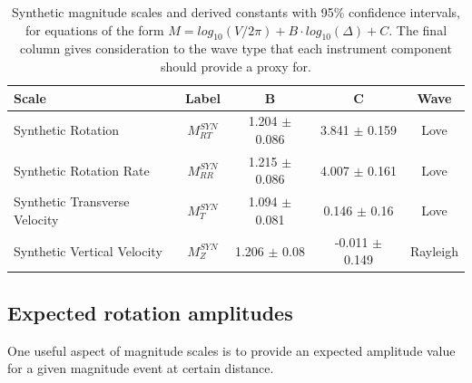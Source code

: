 \documentclass{gji}
\begin{document}
\begin{table}
\begin{minipage}{115mm}
	\begin{center}
		\begin{tabular}{ |l|c|c|c|c| } 
		        \bf{Scale} & \bf{Label} & \bf{B} & \bf{C}  & \bf{Wave}\\ \hline
        Synthetic Rotation  & $M^{SYN}_{RT}$ & 1.204 $\pm$ 0.086 & 3.841 $\pm$ 0.159  & Love \\ \hline
	Synthetic Rotation Rate & $M^{SYN}_{RR}$ & 1.215 $\pm$ 0.086 & 4.007 $\pm$ 0.161  & Love\\ \hline 
        Synthetic Transverse Velocity & $M^{SYN}_T$ & 1.094 $\pm$ 0.081 & 0.146 $\pm$ 0.16 & Love \\ \hline
        Synthetic Vertical Velocity  & $M^{SYN}_Z$ & 1.206 $\pm$ 0.08 & -0.011 $\pm$ 0.149  & Rayleigh \\ \hline
		\end{tabular}
		
    		\caption{Synthetic magnitude scales and derived constants with 95\% confidence intervals, for equations of the form $M = log_{10}(V/2\pi) + B\cdot log_{10}(\Delta) + C$. The final column gives consideration to the wave type that each instrument component should provide a proxy for.}
		\label{tab:syn_scales}
	\end{center}
	\end{minipage}
\end{table}


\subsection{Expected rotation amplitudes}
One useful aspect of magnitude scales is to provide an expected amplitude value for a given magnitude event at certain distance. 
\end{document}
